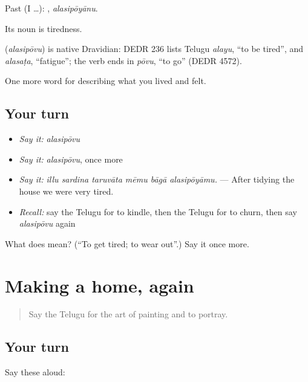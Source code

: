 Past (I …): , \emph{alasipōyānu}.

Its noun  is tiredness.

\begin{cousinweb}
\textbf{} (\emph{alasipōvu}) is native Dravidian: DEDR 236 lists Telugu \emph{alayu}, \textquotedblleft{}to be tired\textquotedblright{}, and \emph{alasaṭa}, \textquotedblleft{}fatigue\textquotedblright{}; the verb ends in \emph{pōvu}, \textquotedblleft{}to go\textquotedblright{} (DEDR 4572).
\end{cousinweb}

\begin{grammarlens}[title={What you've built}]
One more word for describing what you lived and felt.
\end{grammarlens}

\subsection*{Your turn}
\begin{itemize}
\raggedright
  \item \emph{Say it:} \emph{alasipōvu}
  \item \emph{Say it:} \emph{alasipōvu}, once more
  \item \emph{Say it:} \emph{illu sardina taruvāta mēmu bāgā alasipōyāmu.} — After tidying the house we were very tired.
  \item \emph{Recall:} say the Telugu for to kindle, then the Telugu for to churn, then say \emph{alasipōvu} again
\end{itemize}

\begin{tcolorbox}[breakable,colback=teal!4,colframe=teal!35!black,title={Before you move on}]
What does  mean? (\textquotedblleft{}To get tired; to wear out\textquotedblright{}.) Say it once more.
\end{tcolorbox}
\section[(dialogue)]{Making a home, again}

\label{lesson:TE-R549-review-542-549}



\begin{quote}
Say the Telugu for the art of painting and to portray.
\end{quote}

\subsection*{Your turn}
Say these aloud:

